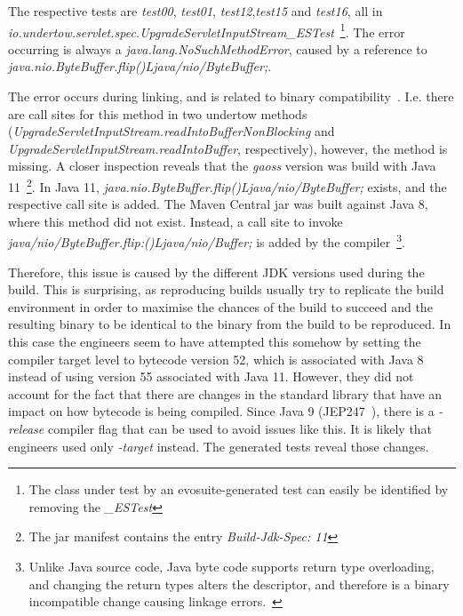 \documentclass[conference]{IEEEtran}
\begin{document}
The respective tests are \textit{test00}, \textit{test01}, \textit{test12},\textit{test15} and \textit{test16}, all in \textit{io.under\-tow.\-servlet.\-spec.UpgradeServletInputStream\_ESTest}~\footnote{The class under test by an evosuite-generated test can easily be identified by removing the \textit{\_ESTest}}. The error occurring is always a \textit{java.lang.NoSuchMethodError}, caused by a reference to \textit{java.nio.ByteBuffer.flip()Ljava/nio/ByteBuffer;}.

The error occurs during linking, and is related to binary compatibility~\cite{JVM17Spec}. I.e. there are call sites for this method in two undertow methods (\textit{UpgradeServletInputStream.readIntoBufferNonBlocking} and \textit{UpgradeServletInputStream.readIntoBuffer}, respectively), however, the method is missing. 
A closer inspection reveals that the \textit{gaoss} version was build with Java 11~\footnote{The jar manifest contains the entry \textit{Build-Jdk-Spec: 11}}. In Java 11, \textit{java.nio.ByteBuffer.flip()Ljava/nio/ByteBuffer;} exists, and the respective call site is added. The Maven Central jar was built against Java 8, where this method did not exist.  Instead, a call site to invoke \textit{java/nio/ByteBuffer.flip:()Ljava/nio/Buffer;} is added by the compiler~\footnote{Unlike Java source code, Java byte code supports return type overloading, and changing the return types alters the descriptor, and therefore is a binary incompatible change causing linkage errors.~\cite{JVM17Spec,dietrich2014broken}}.

Therefore, this issue is caused by the different JDK versions used during the build. This is surprising, as reproducing builds usually try to replicate the build environment in order to maximise the chances of the build to succeed and the resulting binary to be identical to the binary from the build to be reproduced. In this case the engineers seem to have attempted this somehow by setting the compiler target level to bytecode version 52, which is associated with Java 8~\cite[Sect. 4.1]{JVM17Spec} instead of using version 55 associated with Java 11.  However, they did not account for the fact that there are changes in the standard library that have an impact on how bytecode is being compiled. Since Java 9 (JEP247~\cite{jep247}), there is a \textit{-release} compiler  flag that can be used to avoid issues like this. It is likely that engineers used only \textit{-target} instead. The generated tests reveal those changes.  
\end{document}
